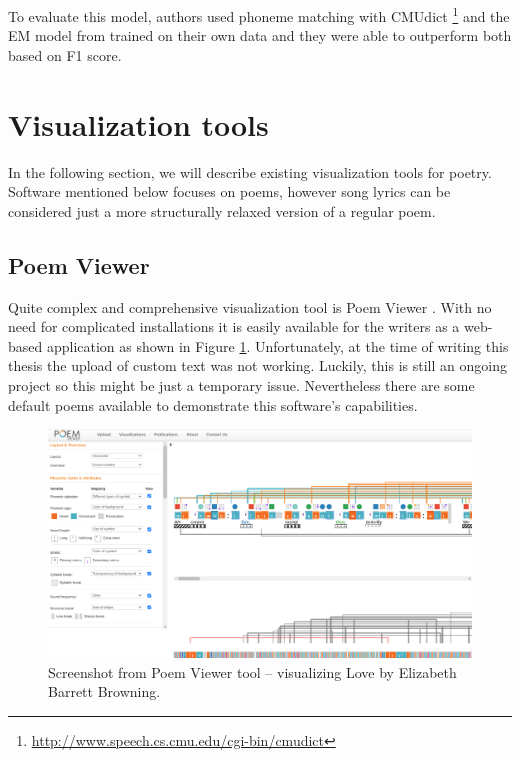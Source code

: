 To evaluate this model, authors used phoneme matching with CMUdict \footnote{\url{http://www.speech.cs.cmu.edu/cgi-bin/cmudict}} and the EM model from \cite{reddy2011unsupervised} trained on their own data and they were able to outperform both based on F1 score.



\section{Visualization tools}
In the following section, we will describe existing visualization tools for poetry. Software mentioned below focuses on poems, however song lyrics can be considered just a more structurally relaxed version of a regular poem.
\subsection*{Poem Viewer}
Quite complex and comprehensive visualization tool is Poem Viewer \cite{Abdul2013}. With no need for complicated installations it is easily available for the writers as a web-based application as shown in Figure \ref{screenshotPV}. Unfortunately, at the time of writing this thesis the upload of custom text was not working. Luckily, this is still an ongoing project so this might be just a temporary issue. Nevertheless there are some default poems available to demonstrate this software's capabilities.
\begin{figure}[h]\centering
	\includegraphics[scale=0.24]{../img/ScreenshotPV.png}
	\caption{Screenshot from Poem Viewer tool -- visualizing Love by Elizabeth Barrett Browning.}\label{screenshotPV}
\end{figure}

